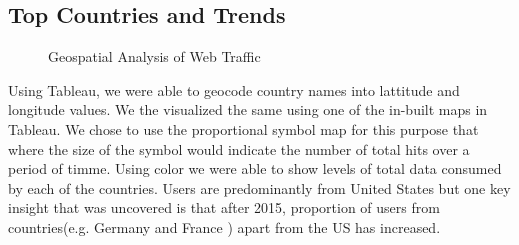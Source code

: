 \subsection{Top Countries and Trends} \label{vizcountries}
 

\begin{figure}
\centering
{}
\caption{Geospatial Analysis of Web Traffic}
\label{fig:TopCountries}
\end{figure}

Using Tableau, we were able to geocode country names into lattitude and longitude values. We the visualized the same using one of the in-built maps in Tableau. We chose to use the proportional symbol map for this purpose that where the size of the symbol would indicate the number of total hits over a period of timme. Using color we were able to show levels of total data consumed by each of the countries. Users are predominantly from United States but one key insight that was uncovered is that after 2015, proportion of users from countries(e.g. Germany and France ) apart from the US has increased. 
